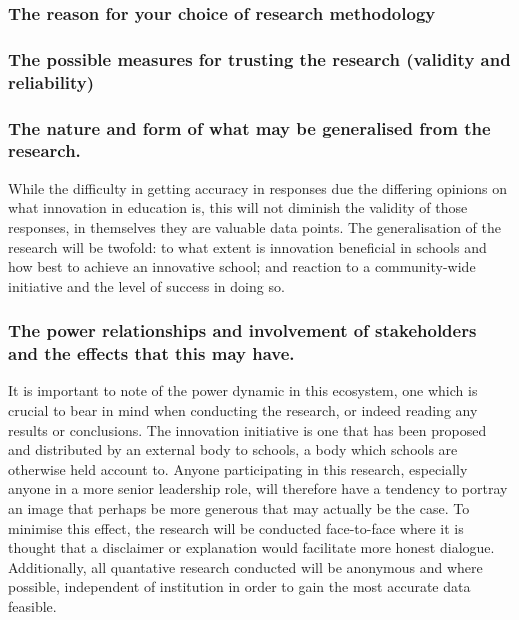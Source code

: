 \subsubsection{The reason for your choice of research methodology}



\subsubsection{The possible measures for trusting the research (validity and reliability)}
\subsubsection{The nature and form of what may be generalised from the research.}

While the difficulty in getting accuracy in responses due the differing opinions on what innovation in education is, this will not diminish the validity of those responses, in themselves they are valuable data points. The generalisation of the research will be twofold: to what extent is innovation beneficial in schools and how best to achieve an innovative school; and reaction to a community-wide initiative and the level of success in doing so.

\subsubsection{The power relationships and involvement of stakeholders and the effects that this may have.}

It is important to note of the power dynamic in this ecosystem, one which is crucial to bear in mind when conducting the research, or indeed reading any results or conclusions. The innovation initiative is one that has been proposed and distributed by an external body to schools, a body which schools are otherwise held account to. Anyone participating in this research, especially anyone in a more senior leadership role, will therefore have a tendency to portray an image that perhaps be more generous that may actually be the case. To minimise this effect, the research will be conducted face-to-face where it is thought that a disclaimer or explanation would facilitate more honest dialogue. Additionally, all quantative research conducted will be anonymous and where possible, independent of institution in order to gain the most accurate data feasible.

